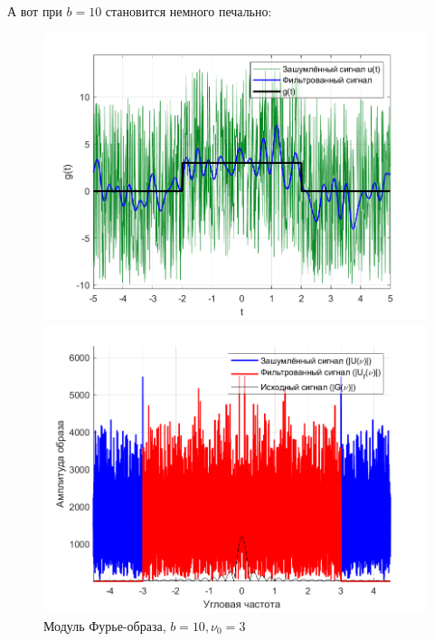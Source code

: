 \documentclass[a4paper]{article}
\begin{document}
А вот при $b = 10$ становится немного печально:

\begin{figure}[H]
    \begin{minipage}{0.5\textwidth}
        \centering
        \includegraphics[width=\textwidth]{part1/10_3.png}
        \caption{$b=10, \nu_0 = 3$}
    \end{minipage}    
    \begin{minipage}{0.5\textwidth}
        \centering
        \includegraphics[width=\textwidth]{part1/10_3_Fourier.png}
        \caption{Модуль Фурье-образа, $b=10, \nu_0 = 3$}
    \end{minipage}
\end{figure}\
\end{document}
